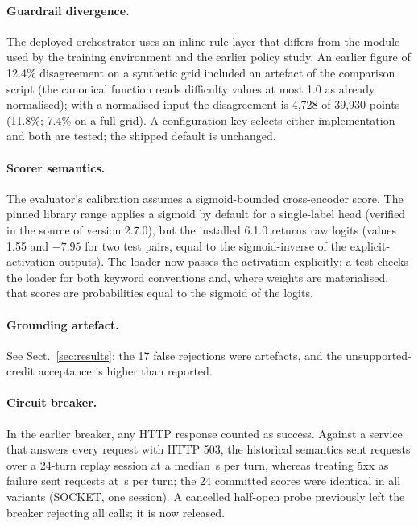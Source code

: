 \paragraph{Guardrail divergence.} The deployed orchestrator uses an inline rule layer that differs from the module used by the training environment and the earlier policy study. An earlier figure of 12.4\% disagreement on a synthetic grid included an artefact of the comparison script (the canonical function reads difficulty values at most 1.0 as already normalised); with a normalised input the disagreement is 4,728 of 39,930 points (11.8\%; 7.4\% on a full grid). A configuration key selects either implementation and both are tested; the shipped default is unchanged.
\paragraph{Scorer semantics.} The evaluator's calibration assumes a sigmoid-bounded cross-encoder score. The pinned library range applies a sigmoid by default for a single-label head (verified in the source of version 2.7.0), but the installed 6.1.0 returns raw logits (values 1.55 and $-7.95$ for two test pairs, equal to the sigmoid-inverse of the explicit-activation outputs). The loader now passes the activation explicitly; a test checks the loader for both keyword conventions and, where weights are materialised, that scores are probabilities equal to the sigmoid of the logits.
\paragraph{Grounding artefact.} See Sect.~\ref{sec:results}: the 17 false rejections were artefacts, and the unsupported-credit acceptance is higher than reported.
\paragraph{Circuit breaker.} In the earlier breaker, any HTTP response counted as success. Against a service that answers every request with HTTP 503, the historical semantics sent \bfivezerothreeerrfivezerothreelegacy{} requests over a 24-turn replay session at a median \bfivezerothreemederrfivezerothreelegacy{}\,s per turn, whereas treating 5xx as failure sent \bfivezerothreeerrfivezerothreefixed{} requests at \bfivezerothreemederrfivezerothreefixed{}\,s per turn; the 24 committed scores were identical in all variants (SOCKET, one session). A cancelled half-open probe previously left the breaker rejecting all calls; it is now released.
